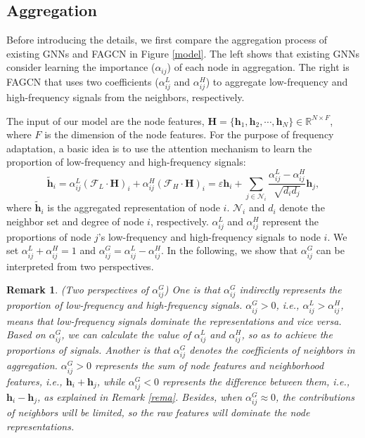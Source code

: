 \documentclass[letterpaper]{article} %
\newtheorem{remark}{Remark}
\begin{document}
\subsection{Aggregation}
Before introducing the details, we first compare the aggregation process of existing GNNs and FAGCN in Figure \ref{model}. The left shows that existing GNNs consider learning the importance ($\alpha_{ij}$) of each node in aggregation. The right is FAGCN that uses two coefficients ($\alpha^{L}_{ij}$ and $\alpha^{H}_{ij}$) to aggregate low-frequency and high-frequency signals from the neighbors, respectively.

The input of our model are the node features, $\mathbf{H}=\{ \mathbf{h}_{1},\mathbf{h}_{2},\cdots,\mathbf{h}_{N} \} \in \mathbb{R}^{N \times F}$, where $F$ is the dimension of the node features.
For the purpose of frequency adaptation, a basic idea is to use the attention mechanism to learn the proportion of low-frequency and high-frequency signals:
\begin{equation}
	\tilde{\mathbf{h}}_{i} = \alpha_{ij}^{L} (\mathcal{F}_{L} \cdot \mathbf{H})_{i} + \alpha_{ij}^{H} (\mathcal{F}_{H} \cdot \mathbf{H})_{i} = \varepsilon \mathbf{h}_{i} + \sum_{j \in \mathcal{N}_{i}} \frac{\alpha_{ij}^{L} - \alpha_{ij}^{H}}{\sqrt{d_{i}d_{j}}} \mathbf{h}_{j},
\end{equation}
where $\tilde{\mathbf{h}}_{i}$ is the aggregated representation of node $i$. $\mathcal{N}_{i}$ and $d_{i}$ denote the neighbor set and degree of node $i$, respectively. $\alpha_{ij}^{L}$ and $\alpha_{ij}^{H}$ represent the proportions of node $j$'s low-frequency and high-frequency signals to node $i$. 
We set $\alpha_{ij}^{L} + \alpha_{ij}^{H}=1$ and $\alpha_{ij}^{G} = \alpha_{ij}^{L} - \alpha_{ij}^{H}$.
In the following, we show that $\alpha_{ij}^{G}$ can be interpreted from two perspectives.

\begin{remark}
	(Two perspectives of $\alpha_{ij}^{G}$) One is that $\alpha_{ij}^{G}$ indirectly represents the proportion of low-frequency and high-frequency signals.  $\alpha_{ij}^{G} > 0$, i.e., $\alpha_{ij}^{L} > \alpha_{ij}^{H}$, means that low-frequency signals dominate the representations and vice versa. 
	Based on $\alpha_{ij}^{G}$, we can calculate the value of $\alpha_{ij}^{L}$ and $\alpha_{ij}^{H}$, so as to achieve the proportions of signals.
	Another is that $\alpha_{ij}^{G}$ denotes the coefficients of neighbors in aggregation. $\alpha_{ij}^{G} > 0$ represents the sum of node features and neighborhood features, i.e., $\mathbf{h}_{i} + \mathbf{h}_{j}$, while $\alpha_{ij}^{G} < 0$ represents the difference between them, i.e., $\mathbf{h}_{i} - \mathbf{h}_{j}$, as explained in Remark \ref{rema}. Besides, when $\alpha_{ij}^{G} \approx 0$, the contributions of neighbors will be limited, so the raw features will dominate the node representations. 
\end{remark}
\end{document}
